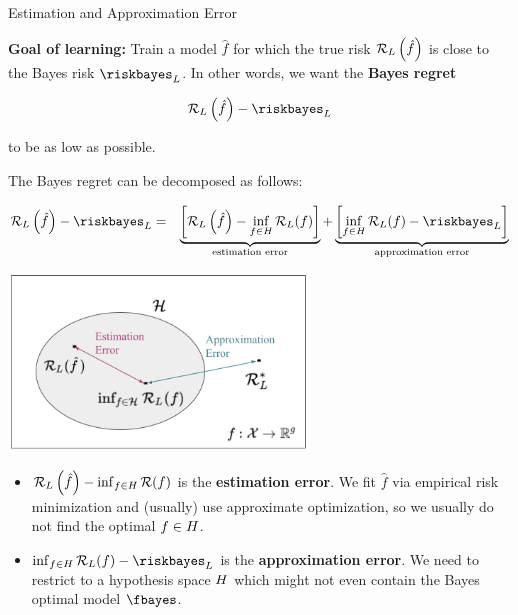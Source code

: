 \begin{vbframe}{Estimation and Approximation Error} 

\textbf{Goal of learning: } Train a model $\hat f$ for which the true risk $\mathcal{R}_L\left(\hat f\right)$ is close to the Bayes risk $\riskbayes_L$. In other words, we want the \textbf{Bayes regret}


$$
	\risk_L\left(\hat f\right) - \riskbayes_{L}
$$ 

to be as low as possible. 

\lz 

The Bayes regret can be decomposed as follows: 

\begin{eqnarray*}
	\risk_L\left(\hat f\right) - \riskbayes_{L} &=& \underbrace{\left[\risk_L\left(\hat f\right) - \inf_{f \in \Hspace} \risk_L(f)\right]}_{\text{estimation error}} + \underbrace{\left[\inf_{f \in \Hspace} \risk_L(f) - \riskbayes_{L}\right]}_{\text{approximation error}}
\end{eqnarray*}

\framebreak 


\begin{center}
\includegraphics[width=0.6\textwidth]{figure_man/risk_minimization_diagram.png}
\end{center}

\begin{itemize}
	\item $\mathcal{R}_L\left(\hat f\right) - \inf_{f \in H} \mathcal{R}(f)$ is the \textbf{estimation error}. We fit $\hat f$ via empirical risk minimization and (usually) use approximate optimization, so we usually do not find the optimal $f \in H$.
	\item $\inf_{f \in \Hspace} \risk_L(f) - \riskbayes_{L}$ is the \textbf{approximation error}. We need to restrict to a hypothesis space $H$ which might not even contain the Bayes optimal model $\fbayes$. 
\end{itemize}

\end{vbframe}


